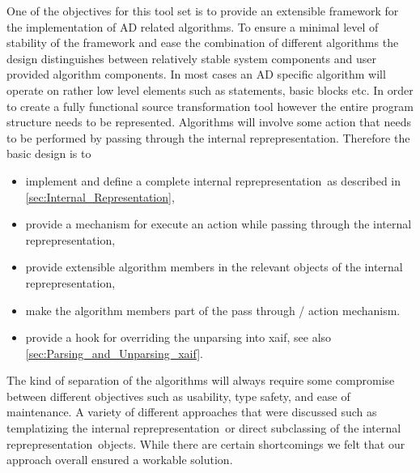 \documentclass{book}
\newcommand{\InternalRep}{internal reprepresentation}
\newcommand{\xaif}{xaif}
\begin{document}
One of the objectives for this tool set is to provide an extensible framework 
for the implementation of AD related algorithms. To ensure a minimal level 
of stability of the framework and ease the combination of different algorithms
the design distinguishes between relatively stable system components 
and user provided algorithm components. 
In most cases an AD specific algorithm will operate on rather low level 
elements such as statements, basic blocks etc. In order to create a fully functional 
source transformation tool however the entire program structure needs to be 
represented. 
Algorithms will involve some action that needs to be 
performed by passing through the \InternalRep.
Therefore the basic design is to 
\begin{itemize}
\item implement and define a complete \InternalRep\ as described in \ref{sec:Internal_Representation},
\item provide a mechanism for execute an action while passing through the \InternalRep,
\item provide extensible algorithm members in the relevant objects of the \InternalRep,
\item make the algorithm members part of the pass through / action mechanism.
\item provide a hook for overriding the unparsing into \xaif, see also \ref{sec:Parsing_and_Unparsing_xaif}.
\end{itemize}
The kind of separation of the algorithms will always require some compromise 
between different objectives such as usability, type safety, and ease of maintenance. 
A variety of different approaches that were discussed such as templatizing the 
\InternalRep\ or direct subclassing of the \InternalRep\ objects. While there are 
certain shortcomings we felt that our approach overall ensured a workable solution.
\end{document}
